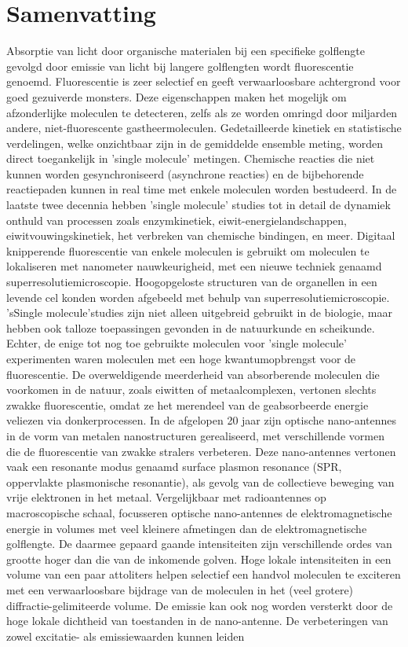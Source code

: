 \chapter*{Samenvatting}
\label{ch:Samenvatting}

Absorptie van licht door organische materialen bij een specifieke golflengte gevolgd door emissie
van licht bij langere golflengten wordt fluorescentie genoemd. Fluorescentie is zeer selectief en geeft verwaarloosbare achtergrond voor goed gezuiverde monsters. Deze eigenschappen maken het mogelijk om afzonderlijke moleculen te detecteren, zelfs als ze worden omringd door miljarden andere, niet-fluorescente gastheermoleculen. Gedetailleerde kinetiek en statistische verdelingen, welke onzichtbaar zijn in de gemiddelde ensemble meting, worden direct toegankelijk in ’single molecule’ metingen. Chemische reacties die niet kunnen worden gesynchroniseerd (asynchrone reacties) en de bijbehorende reactiepaden kunnen in real time met enkele moleculen worden bestudeerd. In de laatste twee decennia hebben ’single molecule’ studies tot in detail de dynamiek onthuld van processen zoals enzymkinetiek, eiwit-energielandschappen, eiwitvouwingskinetiek, het verbreken van chemische bindingen, en meer. Digitaal knipperende fluorescentie van enkele moleculen is gebruikt om moleculen te lokaliseren met nanometer nauwkeurigheid, met een nieuwe techniek genaamd superresolutiemicroscopie. Hoogopgeloste  structuren van de organellen in een levende cel konden worden afgebeeld met behulp van superresolutiemicroscopie. ’sSingle molecule’studies zijn niet alleen uitgebreid gebruikt in de biologie, maar hebben ook talloze toepassingen gevonden in de natuurkunde en scheikunde. Echter, de enige tot nog toe gebruikte moleculen voor ’single molecule’ experimenten waren moleculen met een hoge kwantumopbrengst voor de fluorescentie. De overweldigende meerderheid van absorberende moleculen die voorkomen in de natuur, zoals eiwitten of metaalcomplexen, vertonen slechts zwakke fluorescentie, omdat ze het merendeel van de geabsorbeerde energie veliezen via donkerprocessen. In de afgelopen 20 jaar zijn optische nano-antennes in de vorm van metalen nanostructuren gerealiseerd, met verschillende vormen die de fluorescentie van zwakke stralers verbeteren. Deze nano-antennes vertonen vaak een resonante modus genaamd surface plasmon resonance (SPR, oppervlakte plasmonische resonantie), als gevolg van de collectieve beweging van vrije elektronen in het metaal. Vergelijkbaar met radioantennes op macroscopische schaal, focusseren optische nano-antennes de elektromagnetische energie in volumes met veel kleinere afmetingen dan de elektromagnetische golflengte. De daarmee gepaard gaande intensiteiten zijn verschillende ordes van grootte hoger dan die van de inkomende golven. Hoge lokale intensiteiten in een volume van een paar attoliters helpen selectief een handvol moleculen te exciteren met een verwaarloosbare bijdrage van de moleculen in het (veel grotere) diffractie-gelimiteerde volume. De emissie kan ook nog worden versterkt door de hoge lokale dichtheid van toestanden in de nano-antenne. De verbeteringen van zowel excitatie- als emissiewaarden kunnen leiden 
